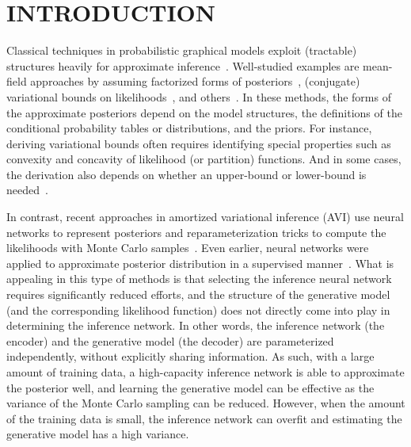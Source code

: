 \section{INTRODUCTION}

Classical techniques in probabilistic graphical models exploit (tractable) structures heavily for approximate inference~\citep{koller2009probabilistic}. Well-studied examples are mean-field approaches by assuming factorized forms of posteriors~\citep{ jordan1999introduction},  (conjugate) variational bounds on likelihoods~\citep{jaakkola1999variational, jaakkola2000bayesian},   and others~\citep{saul1996mean,saul1996exploiting}.  In these methods, the forms of the approximate posteriors depend on the model structures, the definitions of the conditional probability tables or distributions, and the priors. %
For instance, deriving variational bounds often requires identifying special properties such as convexity and concavity of likelihood (or partition) functions. And in some cases, the derivation also depends on whether an upper-bound or lower-bound is needed~\citep{jebara2001reversing}. %

In contrast, recent approaches in amortized variational inference  (AVI) use neural networks to represent posteriors and reparameterization tricks to compute the likelihoods with Monte Carlo samples~\citep{kingma2013auto,mnih2014neural}. 
Even earlier, neural networks were applied to approximate posterior distribution in a supervised manner~\citep{morris2001recognition}.
What is appealing in this type of methods is that selecting the inference neural network requires significantly reduced efforts, and the structure of the generative model (and the corresponding likelihood function) does not directly come into play in determining the inference network. In other words,  the inference network (\ie the encoder) and the generative model (\ie the decoder) are parameterized independently, without explicitly sharing information.  As such, with a large amount of training data, a high-capacity inference network is able to approximate the posterior well, and learning the generative model can be effective as the variance of the Monte Carlo sampling can be reduced. However, when the amount of the training data is small, the inference network can overfit and estimating the generative model has a high variance.

